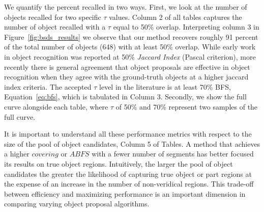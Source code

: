 We quantify the percent recalled in two ways. First, we look at the number of objects recalled for two specific $\tau$ values. Column 2 of all tables captures the number of object recalled with a $\tau$ equal to 50\% overlap. Interpreting column 3 in Figure~\ref{fig:bsds_results} we observe that our method recovers roughly 91 percent of the total number of objects (648) with at least 50\% overlap. While early work in object recognition was reported at 50\% \emph{Jaccard Index} (Pascal criterion), more recently there is general agreement that object proposals are effective in object recognition when they agree with the ground-truth objects at a higher jaccard index criteria. The accepted $\tau$ level in the literature is at least 70\% BFS, Equation~\ref{eq:bfs}, which is tabulated in Column 3. Secondly, we show the full curve alongside each table, where $\tau$ of 50\% and 70\% represent two samples of the full curve. 

It is important to understand all these performance metrics with respect to the size of the pool of object candidates, Column 5 of Tables. A method that achieves a higher $covering$ or $ABFS$ with a fewer number of segments has better focused its results on true object regions. Intuitively, the larger the pool of object candidates the greater the likelihood of capturing true object or part regions at the expense of an increase in the number of non-veridical regions. This trade-off between efficiency and maximizing performance is an important dimension in comparing varying object proposal algorithms. 


